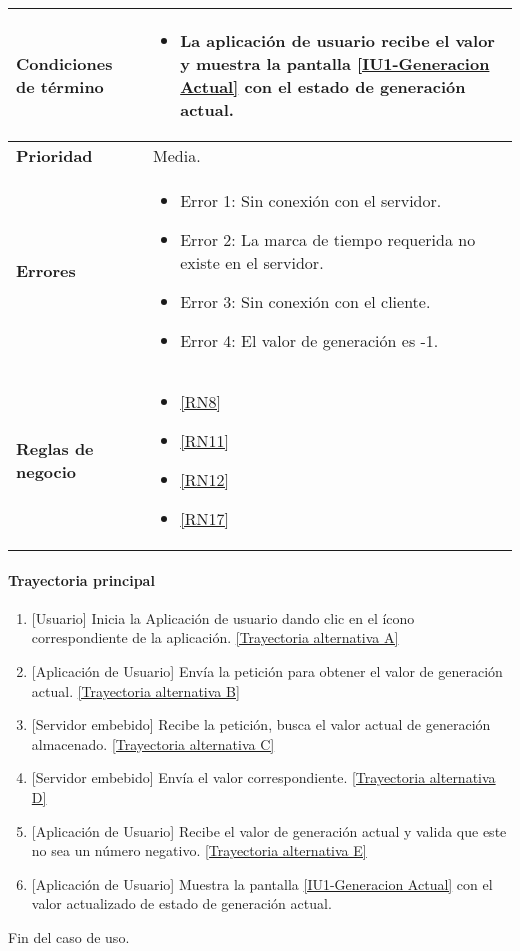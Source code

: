 \begin{longtable}{|J{5cm}|J{10.3cm}|}
	\textbf{Condiciones de término} & 
		\begin{itemize}
			\item La aplicación de usuario recibe el valor y muestra la pantalla \hyperref[fig:monitoreo]{[IU1-Generacion Actual]} con el estado de generación actual.
		\end{itemize} \\ \hline 
	\textbf{Prioridad} & 
		Media. \\ \hline
	\textbf{Errores} & 
		\begin{itemize}
		    \item \label{CUU1.1:Error1} Error 1: Sin conexión con el servidor.
			\item \label{CUU1.1:Error2} Error 2: La marca de tiempo requerida no existe en el servidor.
		    \item \label{CUU1.1:Error3} Error 3: Sin conexión con el cliente.
		    \item \label{CUU1.1:Error4} Error 4: El valor de generación es -1.
		\end{itemize} \\ \hline
	\textbf{Reglas de negocio} & 
		\begin{itemize}
		    \item \ref{RN8}
			\item \ref{RN11}
			\item \ref{RN12}
			\item \ref{RN17}
		\end{itemize} \\ \hline
\end{longtable}

\paragraph{Trayectoria principal}
    \label{SUB-U-CU1.1:TP}
	\begin{enumerate}
	    \item {[Usuario]} Inicia la Aplicación de usuario dando clic en el ícono correspondiente de la aplicación. \hyperref[SUB-U-CU1.1:TA]{[Trayectoria alternativa A]}
	    \item {[Aplicación de Usuario]} Envía la petición para obtener el valor de generación actual. \hyperref[SUB-U-CU1.1:TB]{[Trayectoria alternativa B]} 
	    \item {[Servidor embebido]} Recibe la petición, busca el valor actual de generación almacenado. \hyperref[SUB-U-CU1.1:TC]{[Trayectoria alternativa C]}
	    \item {[Servidor embebido]} Envía el valor correspondiente. \hyperref[SUB-U-CU1.1:TD]{[Trayectoria alternativa D]} 
	    \item {[Aplicación de Usuario]} Recibe el valor de generación actual y valida que este no sea un número negativo. \hyperref[SUB-U-CU1.1:TE]{[Trayectoria alternativa E]} 
	    \item {[Aplicación de Usuario]} Muestra la pantalla \hyperref[fig:monitoreo]{[IU1-Generacion Actual]} con el valor actualizado de estado de generación actual.
	\end{enumerate}
	Fin del caso de uso.

